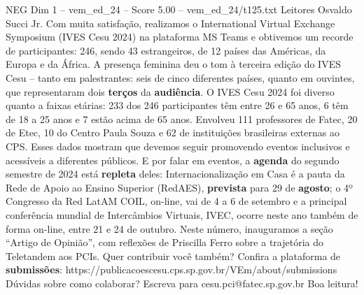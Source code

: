 \begin{textsample}{NEG Dim 1 – vem\_ed\_24 – Score 5.00 – vem\_ed\_24/t125.txt}  \label{ex:f1_neg_133}
Leitores Osvaldo Succi Jr.
Com muita satisfação, realizamos o International Virtual Exchange Symposium (IVES Cesu 2024) na plataforma MS Teams e obtivemos um recorde de participantes: 246, sendo 43 estrangeiros, de 12 países das Américas, da Europa e da África.
A presença feminina deu o tom à terceira edição do IVES Cesu – tanto em palestrantes: seis de cinco diferentes países, quanto em ouvintes, que representaram dois \textbf{terços} da \textbf{audiência}.
O IVES Cesu 2024 foi diverso quanto a faixas etárias: 233 dos 246 participantes têm entre 26 e 65 anos, 6 têm de 18 a 25 anos e 7 estão acima de 65 anos.
Envolveu 111 professores de Fatec, 20 de Etec, 10 do Centro Paula Souza e 62 de instituições brasileiras externas ao CPS.
Esses dados mostram que devemos seguir promovendo eventos inclusivos e acessíveis a diferentes públicos.
E por falar em eventos, a \textbf{agenda} do segundo semestre de 2024 está \textbf{repleta} deles: Internacionalização em Casa é a pauta da Rede de Apoio ao Ensino Superior (RedAES), \textbf{prevista} para 29 de \textbf{agosto}; o 4º Congresso da Red LatAM COIL, on-line, vai de 4 a 6 de setembro e a principal conferência mundial de Intercâmbios Virtuais, IVEC, ocorre neste ano também de forma on-line, entre 21 e 24 de outubro.
Neste número, inauguramos a seção “Artigo de Opinião”, com reflexões de Priscilla Ferro sobre a trajetória do Teletandem aos PCIs.
Quer contribuir você também?
Confira a plataforma de \textbf{submissões}: https://publicacoescesu.cps.sp.gov.br/VEm/about/submissions Dúvidas sobre como colaborar?
Escreva para cesu.pci@fatec.sp.gov.br Boa leitura!

\end{textsample}
